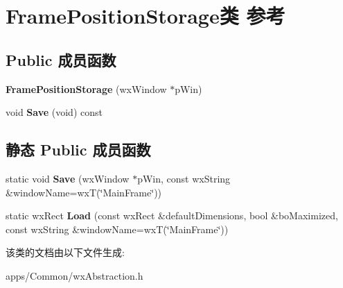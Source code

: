 \hypertarget{class_frame_position_storage}{\section{Frame\+Position\+Storage类 参考}
\label{class_frame_position_storage}
}
\subsection*{Public 成员函数}
\begin{DoxyCompactItemize}
\item 
\hypertarget{class_frame_position_storage_affd7bb313fa97be5c5a04deff2cf66fe}{{\bfseries Frame\+Position\+Storage} (wx\+Window $\ast$p\+Win)}\label{class_frame_position_storage_affd7bb313fa97be5c5a04deff2cf66fe}

\item 
\hypertarget{class_frame_position_storage_a0b8bb4ef69eb2dda75bd7502db80642a}{void {\bfseries Save} (void) const }\label{class_frame_position_storage_a0b8bb4ef69eb2dda75bd7502db80642a}

\end{DoxyCompactItemize}
\subsection*{静态 Public 成员函数}
\begin{DoxyCompactItemize}
\item 
\hypertarget{class_frame_position_storage_a98b739da9abd9dc3de36950cc5e29b61}{static void {\bfseries Save} (wx\+Window $\ast$p\+Win, const wx\+String \&window\+Name=wx\+T(\char`\"{}Main\+Frame\char`\"{}))}\label{class_frame_position_storage_a98b739da9abd9dc3de36950cc5e29b61}

\item 
\hypertarget{class_frame_position_storage_a0f0e871ce5ef961a3419a93b5acb3ab6}{static wx\+Rect {\bfseries Load} (const wx\+Rect \&default\+Dimensions, bool \&bo\+Maximized, const wx\+String \&window\+Name=wx\+T(\char`\"{}Main\+Frame\char`\"{}))}\label{class_frame_position_storage_a0f0e871ce5ef961a3419a93b5acb3ab6}

\end{DoxyCompactItemize}


该类的文档由以下文件生成\+:\begin{DoxyCompactItemize}
\item 
apps/\+Common/wx\+Abstraction.\+h\end{DoxyCompactItemize}
